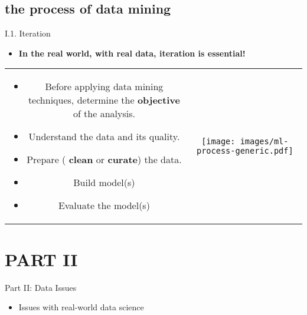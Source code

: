 \documentclass[handout]{beamer}
\newcommand{\strong}[1]{\textbf{\color{teal} #1}}
\newcommand{\stronger}[1]{\textbf{\color{purple} #1}}
\begin{document}
\subsection{the process of data mining}
\begin{frame}{I.1. Iteration}
\begin{itemize}
\item[] \strong{In the real world, with real data, iteration is essential!}
\end{itemize}
\begin{center}
\begin{tabular}{cc}
\begin{minipage}[b]{0.45\textwidth}
\begin{itemize}
\item Before applying data mining techniques, determine the \strong{objective} of the analysis.
\item Understand the data and its quality.
\item Prepare (\stronger{clean} or \stronger{curate}) the data.
\item Build model(s)
\item Evaluate the model(s)
\end{itemize}
\end{minipage} &
\begin{minipage}[b]{0.5\textwidth}
\begin{center}
\texttt{[image: images/ml-process-generic.pdf]}
\end{center}
\end{minipage} \\
\end{tabular}
\end{center}
\end{frame}




\section{PART II}
\begin{frame}{Part II: Data Issues}
\begin{itemize}
\item Issues with real-world data science
\end{itemize}
\end{frame}
\end{document}
